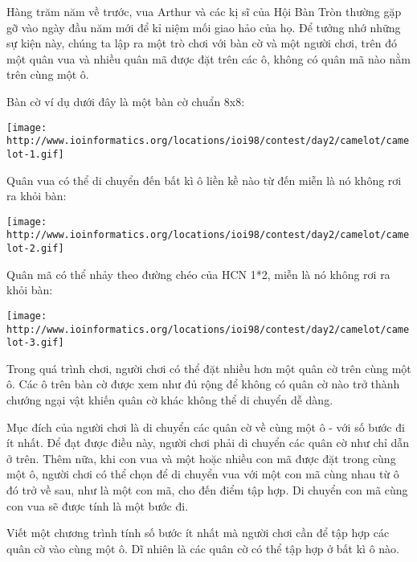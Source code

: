 Hàng trăm năm về trước, vua Arthur và các kị sĩ của Hội Bàn Tròn thường gặp gỡ vào ngày đầu năm mới để kỉ niệm mối giao hảo của họ. Để tưởng nhớ những sự kiện này, chúng ta lập ra một trò chơi với bàn cờ và một người chơi, trên đó một quân vua và nhiều quân mã được đặt trên các ô, không có quân mã nào nằm trên cùng một ô.

Bàn cờ ví dụ dưới đây là một bàn cờ chuẩn 8x8:


\texttt{[image: http://www.ioinformatics.org/locations/ioi98/contest/day2/camelot/camelot-1.gif]}

Quân vua có thể di chuyển đến bất kì ô liền kề nào từ đến miễn là nó không rơi ra khỏi bàn:


\texttt{[image: http://www.ioinformatics.org/locations/ioi98/contest/day2/camelot/camelot-2.gif]}

Quân mã có thể nhảy theo đường chéo của HCN 1*2, miễn là nó không rơi ra khỏi bàn:


\texttt{[image: http://www.ioinformatics.org/locations/ioi98/contest/day2/camelot/camelot-3.gif]}

Trong quá trình chơi, người chơi có thể đặt nhiều hơn một quân cờ trên cùng một ô. Các ô trên bàn cờ được xem như đủ rộng để không có quân cờ nào trở thành chướng ngại vật khiến quân cờ khác không thể di chuyển dễ dàng.

Mục đích của người chơi là di chuyển các quân cờ về cùng một ô - với số bước đi ít nhất. Để đạt được điều này, người chơi phải di chuyển các quân cờ như chỉ dẫn ở trên. Thêm nữa, khi con vua và một hoặc nhiều con mã được đặt trong cùng một ô, người chơi có thể chọn để di chuyển vua với một con mã cùng nhau từ ô đó trở về sau, như là một con mã, cho đến điểm tập hợp. Di chuyển con mã cùng con vua sẽ được tính là một bước đi.

Viết một chương trình tính số bước ít nhất mà người chơi cần để tập hợp các quân cờ vào cùng một ô. Dĩ nhiên là các quân cờ có thể tập hợp ở bất kì ô nào.

\